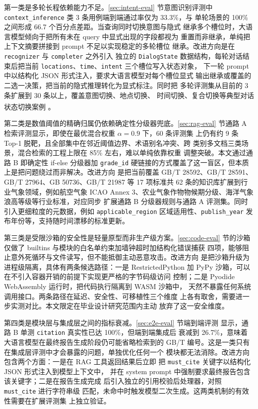 \documentclass[a4paper]{article}
\theoremstyle{definition}
\theoremstyle{plain}
\theoremstyle{remark}
\let\oldcite\cite
\renewcommand{\cite}[1]{\textsuperscript{\oldcite{#1}}}
\newcommand{\bk}{\discretionary{}{}{}}
\begin{document}
第一类是多轮长程依赖能力不足。\ref{sec:intent-eval} 节意图识别评测中
\texttt{context\_\bk{}inference} 类 3 条用例端到端通过率仅为 33.3\%，与
单轮场景的 100\% 之间形成 66.7 个百分点差距。当查询同时切换意图与隐式
继承多个槽位时，大语言模型倾向于把所有未在 query 中显式出现的字段都视为
重置而非继承，单纯把上下文摘要拼接到 prompt 不足以实现稳定的多轮槽位
继承。改进方向是在 \texttt{recognizer} 与 \texttt{completer} 之外引入
独立的 \texttt{DialogState} 数据结构，每轮对话结束后把当前
\texttt{locations}、\texttt{time}、\texttt{intent} 三个槽位写入状态对象，
下一轮 prompt 中以结构化 JSON 形式注入，要求大语言模型对每个槽位显式
输出继承或覆盖的二选一决策，把当前的隐式推理转化为显式标注。同时把
多轮评测集从目前的 3 条扩展到 30 条以上，覆盖意图切换、地点切换、
时间切换、复合切换等典型对话状态切换案例 \cite{ref29}。

第二类是数值阈值的精确归属仍依赖确定性分级器兜底。\ref{sec:rag-eval}
节通路 A 检索评测显示，即使在最优混合权重 $\alpha=0.9$ 下，60 条评测集
上仍有约 9 条 Top-1 脱靶，且全部集中在邻近阈值边界、术语别名冲突、跨
类别多文档三类场景，混合检索的工程上限在 85\% 左右，难以单纯依靠权重
调整突破。本文通过通路 B 即确定性 if-else 分级器加 \texttt{grade\_\bk{}id}
硬链接的方式覆盖了这一盲区，但本质上是把问题绕过而非解决。改进方向
是把当前覆盖 GB/T 28592、GB/T 28591、GB/T 27964、GB 50736、GB/T 21987
等 17 项标准共 62 条的知识库扩展到行业气象领域，例如航空气象 ICAO
Annex 3、农业气象作物物候期分级、海洋气象浪高等级等行业标准，对应同步
扩展通路 B 分级器规则与通路 A 评测集。同时引入更细粒度的元数据，例如
\texttt{applicable\_\bk{}region} 区域适用性、\texttt{publish\_\bk{}year}
发布年份等，支持随时间漂移的标准更新。

第三类是受限沙箱的安全性是轻量原型而非生产级方案。\ref{sec:code-eval}
节的沙箱仅做了 builtins 与模块的白名单约束加墙钟超时加结构化错误捕获
四项，能够阻止意外死循环与文件读写，但不能抵御主动恶意攻击。改进方向
是把沙箱升级为进程级隔离，具体有两条候选路径：一是 RestrictedPython
加 PyPy 沙箱，可以在不引入容器开销的前提下实现更严格的字节码级访问
控制；二是 Pyodide WebAssembly 运行时，把代码执行隔离到 WASM 沙箱中，
天然不暴露任何系统调用接口。两条路径在延迟、安全性、可移植性三个维度
上各有取舍，需要进一步实测对比。本文限定在毕业设计研究范围内主动
放弃了这一安全维度。

第四类是模块层与集成层之间的指标衰减。\ref{sec:e2e-eval} 节端到端评测
显示，通路 B 单测 \texttt{citation} 真实性已达 100\%，但端到端集成后
衰减到 26.7\%，意味着大语言模型在最终报告生成阶段仍可能省略检索到的
GB/T 编号。这是一类只有在集成层评测中才会暴露的问题，单独优化任何一个
模块都无法消除。改进方向包含两个方面：一是在 RAG 工具返回结果后立即
把 \texttt{must\_\bk{}cite} 关键字以结构化 JSON 形式注入到模型上下文中，
并在 system prompt 中强制要求最终报告包含该关键字；二是在报告生成完成
后引入独立的引用校验后处理器，对照 \texttt{must\_\bk{}cite} 进行字符串级
匹配，未命中时触发模型二次生成。这两类机制的有效性需要在扩展评测集
上独立验证。
\end{document}
